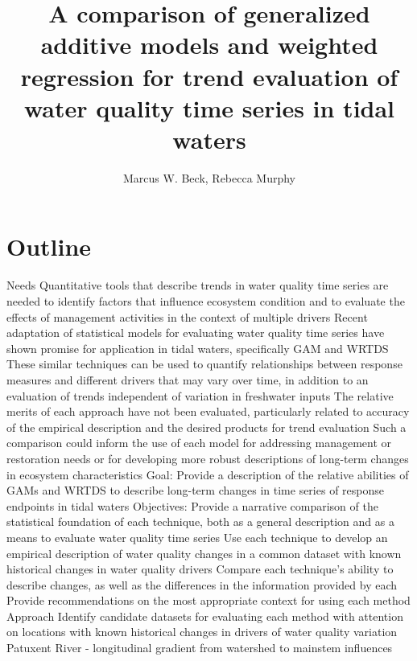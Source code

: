 \documentclass[letterpaper,12pt]{article}\usepackage[]{graphicx}\usepackage[]{color}
\begin{document}
\setlength{\parskip}{5mm}
\setlength{\parindent}{0in}

\title{A comparison of generalized additive models and weighted regression for trend evaluation of water quality time series in tidal waters}
\author{Marcus W. Beck, Rebecca Murphy}
\maketitle

\section{Outline}
\begin{outline}
\1 Needs
\2 Quantitative tools that describe trends in water quality time series are needed to identify factors that influence ecosystem condition and to evaluate the effects of management activities in the context of multiple drivers
\2 Recent adaptation of statistical models for evaluating water quality time series have shown promise for application in tidal waters, specifically \ac{GAM} and \ac{WRTDS}
\2 These similar techniques can be used to quantify relationships between response measures and different drivers that may vary over time, in addition to an evaluation of trends independent of variation in freshwater inputs
\2 The relative merits of each approach have not been evaluated, particularly related to accuracy of the empirical description and the desired products for trend evaluation
\2 Such a comparison could inform the use of each model for addressing management or restoration needs or for developing more robust descriptions of long-term changes in ecosystem characteristics
\1 Goal: Provide a description of the relative abilities of \acp{GAM} and \ac{WRTDS} to describe long-term changes in time series of response endpoints in tidal waters
\1 Objectives:
\2 Provide a narrative comparison of the statistical foundation of each technique, both as a general description and as a means to evaluate water quality time series
\2 Use each technique to develop an empirical description of water quality changes in a common dataset with known historical changes in water quality drivers
\2 Compare each technique's ability to describe changes, as well as the differences in the information provided by each
\2 Provide recommendations on the most appropriate context for using each method
\1 Approach
\2 Identify candidate datasets for evaluating each method with attention on locations with known historical changes in drivers of water quality variation
\3 Patuxent River - longitudinal gradient from watershed to mainstem influences

\end{outline}
\end{document}
